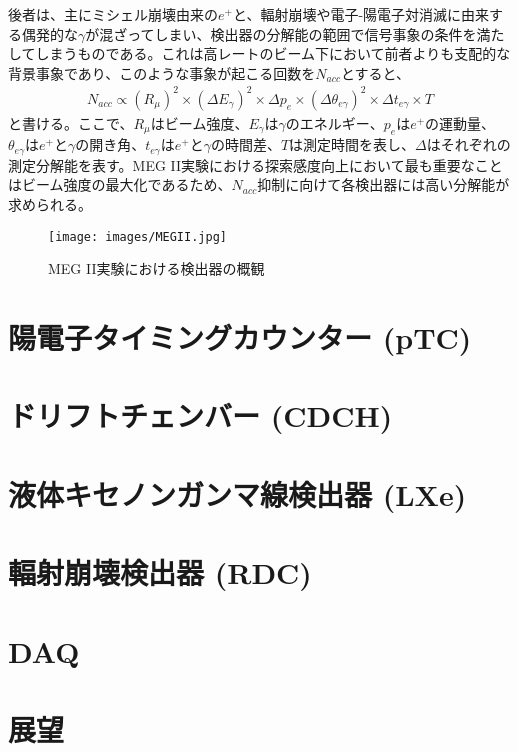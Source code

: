 \documentclass[Yonemoto_master.tex]{subfiles}
\begin{document}
後者は、主にミシェル崩壊由来の$e^+$と、輻射崩壊や電子-陽電子対消滅に由来する偶発的な$\gamma$が混ざってしまい、検出器の分解能の範囲で信号事象の条件を満たしてしまうものである。これは高レートのビーム下において前者よりも支配的な背景事象であり、このような事象が起こる回数を$N_{acc}$とすると、
\begin{align}
N_{acc} \propto (R_\mu)^2 \times (\Delta E_\gamma)^2 \times \Delta p_e \times (\Delta \theta_{e\gamma})^2 \times \Delta t_{e\gamma} \times T
\end{align}
と書ける。ここで、$R_\mu$はビーム強度、$E_\gamma$は$\gamma$のエネルギー、$p_e$は$e^+$の運動量、$\theta_{e\gamma}$は$e^+$と$\gamma$の開き角、$t_{e\gamma}$は$e^+$と$\gamma$の時間差、$T$は測定時間を表し、$\Delta$はそれぞれの測定分解能を表す。MEG II実験における探索感度向上において最も重要なことはビーム強度の最大化であるため、$N_{acc}$抑制に向けて各検出器には高い分解能が求められる。


\begin{figure}[h]
\begin{center}
\texttt{[image: images/MEGII.jpg]}
\caption{MEG II実験における検出器の概観}
\end{center}
\end{figure}



\section{陽電子タイミングカウンター (pTC)}
\section{ドリフトチェンバー (CDCH)}
\section{液体キセノンガンマ線検出器 (LXe)}
\section{輻射崩壊検出器 (RDC)}
\section{DAQ}
\section{展望}

{  }{
\begin{thebibliography}{99}
\end{thebibliography}
}
\end{document}
